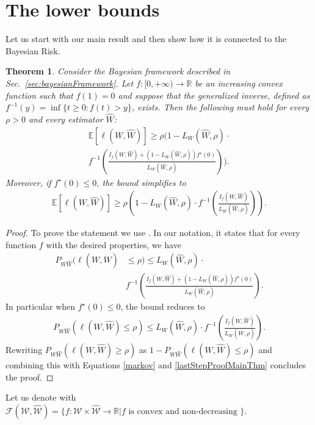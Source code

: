 \documentclass[conference]{IEEEtran}
\theoremstyle{plain}
\newtheorem{theorem}{Theorem}
\theoremstyle{definition}
\theoremstyle{remark}
\newcommand{\E}{\mathbb{E}}
\newcommand{\W}{\mathcal{W}}
\begin{document}
\section{The lower bounds}
Let us start with our main result and then show how it is connected to the Bayesian Risk.
\begin{theorem}
\label{theorem:f_divergences_bound}
Consider the Bayesian framework described in Sec.~\ref{sec:bayesianFramework}. Let $f:[0, +\infty) \to \mathbb{R}$ be an increasing convex function such that $f(1)=0$ and suppose that the generalized inverse, defined as $f^{-1}(y) = \inf\{t\geq 0 : f(t) > y\}$, exists. Then the following must hold for every $\rho>0$ and every estimator $\hat{W}$:
\begin{multline}
    \E[\ell(W, \hat{W})] \geq \rho\Bigg(1- L_W(\hat{W},\rho)\cdot \\ f^{-1}\left(\frac{I_f(W, \hat{W})+(1-L_W(\hat{W},\rho))f^\star(0)}{L_W(\hat{W},\rho)}\right)\Bigg). \label{fDivLowerBound}
\end{multline}
Moreover, if $f^\star(0) \leq 0$, the bound simplifies to
\begin{align}
    \E[\ell(W, \hat{W})] \geq \rho\left(1- L_W(\hat{W},\rho)\cdot f^{-1}\left(\frac{I_f(W, \hat{W})}{L_W(\hat{W},\rho)}\right)\right). \label{fDivLowerBoundSimplified}
\end{align}
\end{theorem}
\begin{proof}
To prove the statement we use \cite[Theorem 3]{fullVersionGeneralization}. In our notation, it states that for every function $f$ with the desired properties, we have 
\begin{align}
    P_{W\hat{W}}(\ell(W, \hat{W})&\leq \rho) \leq L_W(\hat{W}, \rho) \cdot\\& f^{-1}\left(\frac{I_f(W, \hat{W})+(1-L_W(\hat{W},\rho))f^\star(0)}{L_W(\hat{W},\rho)}\right).  \label{lastStepProofMainThm}
\end{align}
In particular when $f^\star(0)\leq 0$, the bound reduces to
\begin{align}
    P_{W\hat{W}}(\ell(W, \hat{W})\leq \rho) \leq L_W(\hat{W}, \rho) \cdot f^{-1}\left(\frac{I_f(W, \hat{W})}{L_W(\hat{W},\rho)}\right).
\end{align}
Rewriting $P_{W\hat{W}}(\ell(W, \hat{W})\geq \rho)$ as $1-P_{W\hat{W}}(\ell(W, \hat{W})\leq \rho)$ and combining this with Equations \eqref{markov} and \eqref{lastStepProofMainThm} concludes the proof.
\end{proof}
\iffalse
Let us denote with $\mathcal{F}(\W,\hat{\W})=\{f:\W\times\hat{\W}\to\mathbb{R} | f\text{ is convex and non-decreasing }\}$.
\end{document}
